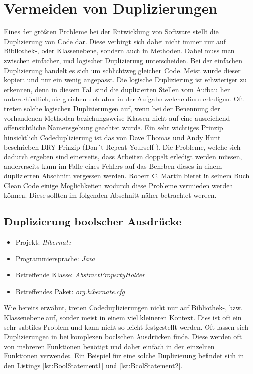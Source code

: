 \section{Vermeiden von Duplizierungen}
Eines der größten Probleme bei der Entwicklung von Software stellt die Duplizierung von Code dar. Diese verbirgt sich dabei nicht immer nur auf Bibliothek-, oder Klassenebene, sondern auch in Methoden. Dabei muss man zwischen einfacher, und logischer Duplizierung unterscheiden. Bei der einfachen Duplizierung handelt es sich um schlichtweg gleichen Code. Meist wurde dieser kopiert und nur ein wenig angepasst. Die logische Duplizierung ist schwieriger zu erkennen, denn in diesem Fall sind die duplizierten Stellen vom Aufbau her unterschiedlich, sie gleichen sich aber in der Aufgabe welche diese erledigen. Oft treten solche logischen Duplizierungen auf, wenn bei der Benennung der vorhandenen Methoden beziehungsweise Klassen nicht auf eine ausreichend offensichtliche Namensgebung geachtet wurde. Ein sehr wichtiges Prinzip hinsichtlich Codeduplizierung ist das von Dave Thomas und Andy Hunt beschrieben DRY-Prinzip (Don´t Repeat Yourself \cite{Hunt1999}).
Die Probleme, welche sich dadurch ergeben sind einerseits, dass Arbeiten doppelt erledigt werden müssen, andererseits kann im Falle eines Fehlers auf das Beheben dieses in einem duplizierten Abschnitt vergessen werden. Robert C. Martin bietet in seinem Buch Clean Code einige Möglichkeiten wodurch diese Probleme vermieden werden können. Diese sollten im folgenden Abschnitt näher betrachtet werden.

\subsection{Duplizierung boolscher Ausdrücke}
\label{cha:BadBoolStatements}
\begin{itemize}
	\item Projekt: \textit{Hibernate}
	\item Programmiersprache: \textit{Java}
	\item Betreffende Klasse: \textit{AbstractPropertyHolder}
	\item Betreffendes Paket: \textit{org.hibernate.cfg}
\end{itemize}

\SuperPar Wie bereits erwähnt, treten Codeduplizierungen nicht nur auf Bibliothek-, bzw. Klassenebene auf, sonder meist in einem viel kleineren Kontext. Dies ist oft ein sehr subtiles Problem und kann nicht so leicht festgestellt werden. Oft lassen sich Duplizierungen in bei komplexen boolschen Ausdrücken finde. Diese werden oft von mehreren Funktionen benötigt und daher einfach in den einzelnen Funktionen verwendet. Ein Beispiel für eine solche Duplizierung befindet sich in den Listings \ref{lst:BoolStatement1} und  \ref{lst:BoolStatement2}.

